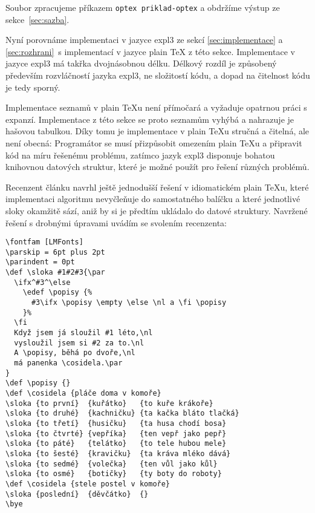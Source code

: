 \documentclass{csbulletin}
\newenvironment{mintedblock}{%
  \par\vspace{\topsep}\vspace{\partopsep}%
  \begingroup
  \fvset{listparameters=\setlength{\topsep}{0pt}\setlength{\partopsep}{0pt}}%
}{%
  \endgroup
  \par\vspace{\topsep}\vspace{\partopsep}%
}
\begin{document}
\begin{mintedblock}
\inputminted[firstnumber=1]{tex}{example-optex.tex}
\end{mintedblock}

\noindent
Soubor zpracujeme příkazem \texttt{optex priklad-optex} a obdržíme výstup ze sekce~\ref{sec:sazba}.

Nyní porovnáme implementaci v jazyce expl3 ze sekcí \ref{sec:implementace} a \ref{sec:rozhrani}\, s implementací v jazyce plain \TeX{} z této sekce. Implementace v jazyce expl3 má takřka dvojnásobnou délku. Délkový rozdíl je způsobený především rozvláčností jazyka expl3, ne složitostí kódu, a dopad na čitelnost kódu je tedy sporný.

Implementace seznamů v plain \TeX u není přímočará a vyžaduje opatrnou práci s expanzí. Implementace z této sekce se proto seznamům vyhýbá a nahrazuje je hašovou tabulkou. Díky tomu je implementace v plain \TeX u stručná a čitelná, ale není obecná: Programátor se musí přizpůsobit omezením plain \TeX u a připravit kód na míru řešenému problému, zatímco jazyk expl3 disponuje bohatou knihovnou datových struktur, které je možné použít pro řešení různých problémů.

Recenzent článku navrhl ještě jednodušší řešení v idiomatickém plain \TeX u, které implementaci algoritmu nevyčleňuje do samostatného balíčku a které jednotlivé sloky okamžitě sází, aniž by si je předtím ukládalo do datové struktury. Navržené řešení s drobnými úpravami uvádím se svolením recenzenta:

\begin{mintedblock}
\begin{verbatim}
\fontfam [LMFonts]
\parskip = 6pt plus 2pt
\parindent = 0pt
\def \sloka #1#2#3{\par
  \ifx^#3^\else
    \edef \popisy {%
      #3\ifx \popisy \empty \else \nl a \fi \popisy
    }%
  \fi
  Když jsem já sloužil #1 léto,\nl
  vysloužil jsem si #2 za to.\nl
  A \popisy, běhá po dvoře,\nl
  má panenka \cosidela.\par
}
\def \popisy {}
\def \cosidela {pláče doma v komoře}
\sloka {to první}  {kuřátko}   {to kuře krákoře}
\sloka {to druhé}  {kachničku} {ta kačka bláto tlačká}
\sloka {to třetí}  {husičku}   {ta husa chodí bosa}
\sloka {to čtvrté} {vepříka}   {ten vepř jako pepř}
\sloka {to páté}   {telátko}   {to tele hubou mele}
\sloka {to šesté}  {kravičku}  {ta kráva mléko dává}
\sloka {to sedmé}  {volečka}   {ten vůl jako kůl}
\sloka {to osmé}   {botičky}   {ty boty do roboty}
\def \cosidela {stele postel v komoře}
\sloka {poslední}  {děvčátko}  {}
\bye
\end{verbatim}
\end{mintedblock}
\end{document}
